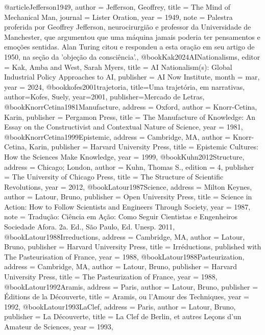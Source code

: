@article{Jefferson1949,
  author  = {Jefferson, Geoffrey},
  title   = {{The Mind of Mechanical Man}},
  journal = {{Lister Oration}},
  year    = {1949},
  note    = {Palestra proferida por Geoffrey Jefferson, neurocirurgião e professor da Universidade de Manchester, que argumentou que uma máquina jamais poderia ter pensamentos e emoções sentidas. Alan Turing citou e respondeu a esta oração em seu artigo de 1950, na seção da 'objeção da consciência'.},
}
@book{Kak2024AINationalisms,
  editor    = {Kak, Amba and West, Sarah Myers},
  title     = {{AI Nationalism(s): Global Industrial Policy Approaches to AI}},
  publisher = {AI Now Institute},
  month     = mar,
  year      = {2024},
}
@book{kofes2001trajetoria,
  title={Uma trajetória, em narrativas},
  author={Kofes, Suely},
  year={2001},
  publisher={Mercado de Letras},
}
@book{KnorrCetina1981Manufacture,
  address   = {Oxford},
  author    = {Knorr-Cetina, Karin},
  publisher = {Pergamon Press},
  title     = {{The Manufacture of Knowledge: An Essay on the Constructivist and Contextual Nature of Science}},
  year      = {1981},
}
@book{KnorrCetina1999Epistemic,
  address   = {Cambridge, MA},
  author    = {Knorr-Cetina, Karin},
  publisher = {Harvard University Press},
  title     = {{Epistemic Cultures: How the Sciences Make Knowledge}},
  year      = {1999},
}
@book{Kuhn2012Structure,
  address   = {Chicago; London},
  author    = {Kuhn, Thomas S.},
  edition   = {4},
  publisher = {The University of Chicago Press},
  title     = {{The Structure of Scientific Revolutions}},
  year      = {2012},
}
@book{Latour1987Science,
  address   = {Milton Keynes},
  author    = {Latour, Bruno},
  publisher = {Open University Press},
  title     = {{Science in Action: How to Follow Scientists and Engineers Through Society}},
  year      = {1987},
  note      = {Tradução: Ciência em Ação: Como Seguir Cientistas e Engenheiros Sociedade Afora. 2a. Ed., São Paulo, Ed. Unesp. 2011},
}
@book{Latour1988Irreductions,
  address   = {Cambridge, MA},
  author    = {Latour, Bruno},
  publisher = {Harvard University Press},
  title     = {{Irréductions, published with The Pasteurisation of France}},
  year      = {1988},
}
@book{Latour1988Pasteurization,
  address   = {Cambridge, MA},
  author    = {Latour, Bruno},
  publisher = {Harvard University Press},
  title     = {{The Pasteurization of France}},
  year      = {1988},
}
@book{Latour1992Aramis,
  address   = {Paris},
  author    = {Latour, Bruno},
  publisher = {Éditions de la Découverte},
  title     = {{Aramis, ou l'Amour des Techniques}},
  year      = {1992},
}
@book{Latour1993LaClef,
  address   = {Paris},
  author    = {Latour, Bruno},
  publisher = {La Découverte},
  title     = {{La Clef de Berlin, et autres Leçons d'un Amateur de Sciences}},
  year      = {1993},
}
